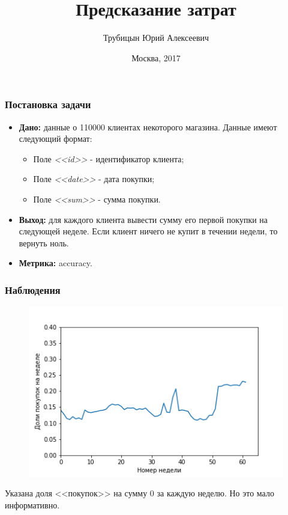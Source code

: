 \documentclass[serif,utf8]{beamer}
\begin{document}

\title[Предсказание затрат]{Предсказание затрат}
\author[Трубицын Ю. А.]{Трубицын Юрий Алексеевич}
\date{Москва, 2017}


\begin{frame}
\maketitle
\end{frame}


\begin{frame}
\frametitle{Постановка задачи}
\begin{itemize}
\item \textbf{Дано:} данные о 110000 клиентах некоторого магазина. Данные имеют следующий формат:
	\begin{itemize}
	\item Поле \textit{<<id>>} - идентификатор клиента;
	\item Поле \textit{<<date>>} - дата покупки;
	\item Поле \textit{<<sum>>} - сумма покупки.
	\end{itemize}
\item \textbf{Выход:} для каждого клиента вывести сумму его первой покупки
на следующей неделе. Если клиент ничего не купит в течении недели, то вернуть ноль.
\item \textbf{Метрика:} accuracy.
\end{itemize}
\end{frame}

\begin{frame}
\frametitle{Наблюдения}
\begin{figure}[h!]
   \centering
   \includegraphics[width=0.7\linewidth]{PartsZero.png}
\end{figure}
Указана доля <<покупок>> на сумму 0 за каждую неделю. Но это мало информативно.
\end{frame}
\end{document}
